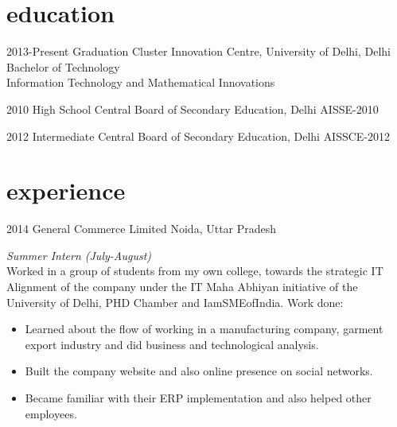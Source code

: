 \documentclass[]{devkhan-cv} %
\begin{document}

\section{education}
	\begin{entrylist}

		\entry
			{2013-Present}
			{Graduation}
			{Cluster Innovation Centre, University of Delhi, Delhi}
			{\small Bachelor of Technology\\Information Technology and Mathematical Innovations}
			

		\entry
			{2010}
			{High School}
			{Central Board of Secondary Education, Delhi}
			{\small AISSE-2010}

		\entry
			{2012}
			{Intermediate}
			{Central Board of Secondary Education, Delhi}
			{\small AISSCE-2012}

	\end{entrylist}


\section{experience}
	\begin{entrylist}

		\entry
			{2014}
			{General Commerce Limited}
			{Noida, Uttar Pradesh}
			{\emph{Summer Intern (July-August)} \\
				Worked in a group of students from my own college, towards the strategic IT Alignment of the company under the IT Maha Abhiyan initiative of the University of Delhi, PHD Chamber and IamSMEofIndia. Work done: \\
			\begin{itemize}
				\item Learned about the flow of working in a manufacturing company, garment export industry and did business and technological analysis.
				\item Built the company website and also online presence on social networks.
				\item Became familiar with their ERP implementation and also helped other employees.
			\end{itemize}
			}

	\end{entrylist}
\end{document}
